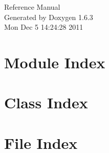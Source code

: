 \documentclass[a4paper]{book}
\begin{document}
\hypersetup{pageanchor=false}
\begin{titlepage}
\vspace*{7cm}
\begin{center}
{\Large Reference Manual}\\
\vspace*{1cm}
{\large Generated by Doxygen 1.6.3}\\
\vspace*{0.5cm}
{\small Mon Dec 5 14:24:28 2011}\\
\end{center}
\end{titlepage}
\clearemptydoublepage
{}
\tableofcontents
\clearemptydoublepage
{}
\hypersetup{pageanchor=true}
\chapter{Module Index}

\chapter{Class Index}

\chapter{File Index}

\end{document}
